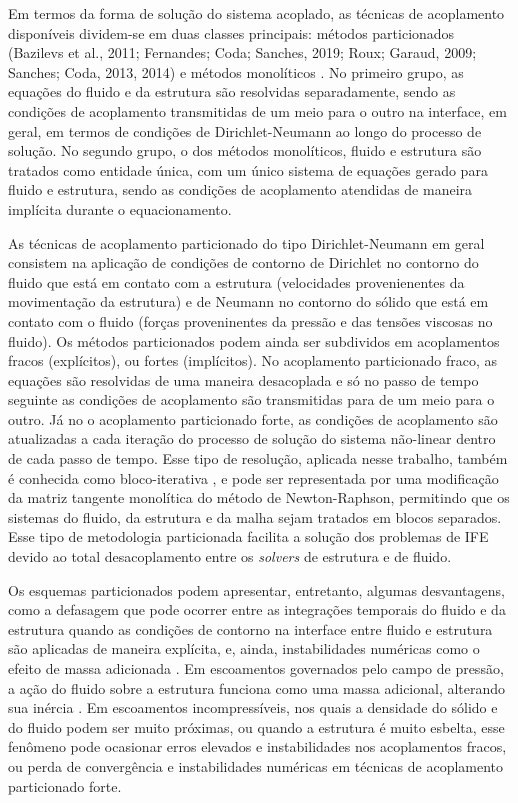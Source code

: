 Em termos da forma de solução do sistema acoplado, as técnicas de acoplamento disponíveis dividem-se em duas classes principais: métodos particionados (Bazilevs et al.,
2011; Fernandes; Coda; Sanches, 2019; Roux; Garaud, 2009; Sanches; Coda, 2013, 2014) e métodos monolíticos \cite{Avancini:2023,Blom:1998,Hubneretal:2004,HronM:2007}. No primeiro grupo, as equações do fluido e da estrutura são resolvidas separadamente, sendo as condições de acoplamento transmitidas de um meio para o outro na interface, em geral, em termos de condições de Dirichlet-Neumann ao longo do processo de solução. No segundo grupo, o dos métodos monolíticos, fluido e estrutura são tratados como entidade única, com um único sistema de equações gerado para fluido e estrutura, sendo as condições de acoplamento atendidas de maneira implícita durante o equacionamento.

As técnicas de acoplamento particionado do tipo Dirichlet-Neumann em geral consistem na aplicação de condições de contorno de Dirichlet no contorno do fluido que está em contato com a estrutura (velocidades provenienentes da movimentação da estrutura) e de Neumann no contorno do sólido que está em contato com o fluido (forças proveninentes da pressão e das tensões viscosas no fluido). Os métodos particionados podem ainda ser subdividos em acoplamentos fracos (explícitos), ou fortes (implícitos). No acoplamento particionado fraco, as equações são resolvidas de uma maneira desacoplada e só no passo de tempo seguinte as condições de acoplamento são transmitidas para de um meio para o outro. Já no o acoplamento particionado forte, as condições de acoplamento são atualizadas a cada iteração do processo de solução do sistema não-linear dentro de cada passo de tempo. Esse tipo de resolução, aplicada nesse trabalho, também é conhecida como bloco-iterativa \cite{BazilevsTT:2013a}, e pode ser representada por uma  modificação da matriz tangente monolítica do método de Newton-Raphson, permitindo que os sistemas do fluido, da estrutura e da malha sejam tratados em blocos separados. Esse tipo de metodologia particionada facilita a solução dos problemas de IFE devido ao total desacoplamento entre os \textit{solvers} de estrutura e de fluido.

Os esquemas particionados podem apresentar, entretanto, algumas desvantagens, como a defasagem que pode ocorrer entre as integrações temporais do fluido e da estrutura quando as condições de contorno na interface entre fluido e estrutura são aplicadas de maneira explícita, e, ainda, instabilidades numéricas como o efeito de massa adicionada \cite{FelippaPF:2001}. Em escoamentos governados pelo campo de pressão, a ação do fluido sobre a estrutura funciona como uma massa adicional, alterando sua inércia \cite{TallecM:2001}. Em escoamentos incompressíveis, nos quais a densidade do sólido e do fluido podem ser muito próximas, ou quando a estrutura é muito esbelta, esse fenômeno pode ocasionar erros elevados e instabilidades nos acoplamentos fracos, ou  perda de convergência e instabilidades numéricas em técnicas de acoplamento particionado forte. 

